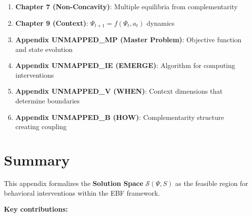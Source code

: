 \begin{enumerate}
    \item \textbf{Chapter 7 (Non-Concavity)}: Multiple equilibria from complementarity
    \item \textbf{Chapter 9 (Context)}: $\Psi_{t+1} = f(\Psi_t, a_t)$ dynamics
    \item \textbf{Appendix UNMAPPED_MP (Master Problem)}: Objective function and state evolution
    \item \textbf{Appendix UNMAPPED_IE (EMERGE)}: Algorithm for computing interventions
    \item \textbf{Appendix UNMAPPED_V (WHEN)}: Context dimensions that determine boundaries
    \item \textbf{Appendix UNMAPPED_B (HOW)}: Complementarity structure creating coupling
\end{enumerate}

\section{Summary}
\label{sec:ss-summary}

This appendix formalizes the \textbf{Solution Space} $\mathcal{S}(\Psi, S)$ as the feasible region for behavioral interventions within the EBF framework.

\textbf{Key contributions:}


